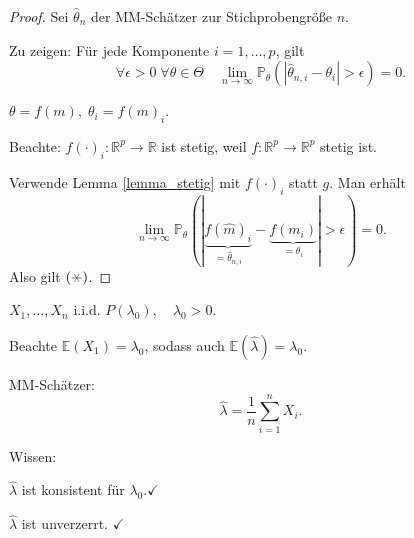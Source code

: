 \documentclass{tstextbook}
\newcommand{\E}{\mathbb E}
\newcommand{\R}{\mathbb R}
\newcommand{\Prob}{\mathbb P}
\begin{document}
\begin{proof}
	Sei $ \hat{\theta}_n $ der MM-Schätzer zur Stichprobengröße $ n $. 
	
	Zu zeigen: Für jede Komponente $ i = 1, \ldots, p $, gilt 
	\[ \forall \epsilon > 0 \; \forall \theta \in \Theta \quad \lim_{n\to \infty} \Prob_\theta \left( \left| \hat{\theta}_{n,i} - \theta_i \right| > \epsilon \right) = 0. \tag{$\hexstar$} \]
	
	$ \theta = f(m), \; \theta_i = f(m)_i $.
	
	Beachte: $ f(\cdot)_i \colon \R^p \rightarrow \R $ ist stetig, weil $ f \colon \R^p \rightarrow \R^p $ stetig ist. 
	
	Verwende Lemma \ref{lemma_stetig} mit $ f(\cdot)_i $ statt $ g $. Man erhält 
	\[
	\lim_{n\to \infty} \Prob_\theta (| \underbrace{f(\hat{m})_i}_{=\hat{\theta}_{n,i}} - \underbrace{f(m_i)}_{=\theta_{i}} | > \epsilon ) = 0.
	\]
	Also gilt $ (\hexstar) $.
\end{proof}


\begin{example}[Poissonverteilung]
	
	
	$ X_1, \ldots, X_n $ i.i.d. $ P(\lambda_0), \quad \lambda_0 > 0 $. 
	
	Beachte $ \E(X_1) = \lambda_0 $, sodass auch $ \E(\hat{\lambda}) = \lambda_0 $.
	
	MM-Schätzer: \[ \hat{\lambda} = \frac{1}{n} \sum_{i=1}^{n} X_i. \]
	
	Wissen: 
	
	$ \hat{\lambda} $ ist konsistent für $ \lambda_0. \checkmark $
	
	$ \hat{\lambda} $ ist unverzerrt. $ \checkmark $
\end{example}
\end{document}
